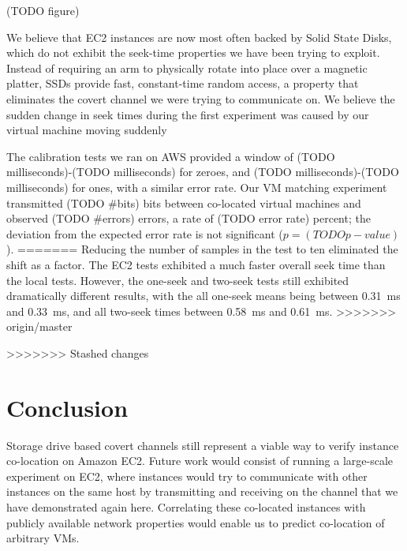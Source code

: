 \documentclass[conference]{IEEEtran}
\begin{document}
(TODO figure)

We believe that EC2 instances are now most often backed by Solid State Disks, which do not exhibit the seek-time
  properties we have been trying to exploit.
Instead of requiring an arm to physically rotate into place over a magnetic platter, SSDs provide fast, constant-time
  random access, a property that eliminates the covert channel we were trying to communicate on.
We believe the sudden change in seek times during the first experiment was caused by our virtual machine moving suddenly

The calibration tests we ran on AWS provided a window of (TODO milliseconds)-(TODO milliseconds) for zeroes, and (TODO
  milliseconds)-(TODO milliseconds) for ones, with a similar error rate.
Our VM matching experiment transmitted (TODO \#bits) bits between co-located virtual machines and observed
  (TODO \#errors) errors, a rate of (TODO error rate) percent; the deviation from the expected error rate is not
  significant ($p = (TODO p-value)$).
=======
Reducing the number of samples in the test to ten eliminated the shift as a factor.
The EC2 tests exhibited a much faster overall seek time than the local tests.
However, the one-seek and two-seek tests still exhibited dramatically different results, with the all one-seek means
  being between \SI{0.31}{ms} and \SI{0.33}{ms}, and all two-seek times between \SI{0.58}{ms} and \SI{0.61}{ms}.
>>>>>>> origin/master

>>>>>>> Stashed changes
\section{Conclusion}
Storage drive based covert channels still represent a viable way to verify instance co-location on Amazon EC2.
Future work would consist of running a large-scale experiment on EC2, where instances would try to communicate with
  other instances on the same host by transmitting and receiving on the channel that we have demonstrated again here.
Correlating these co-located instances with publicly available network properties would enable us to predict
  co-location of arbitrary VMs.




\end{document}
